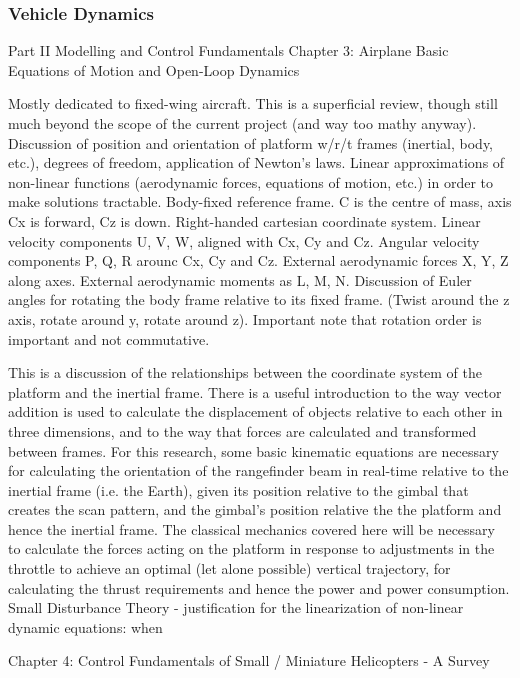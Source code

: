 \documentclass[10pt]{article}
\begin{document}
\subsubsection{Vehicle Dynamics}

\cite{Valavanis2007}

Part II Modelling and Control Fundamentals
Chapter 3: Airplane Basic Equations of Motion and Open-Loop Dynamics

Mostly dedicated to fixed-wing aircraft.
This is a superficial review, though still much beyond the scope of the current project (and way too mathy anyway).
Discussion of position and orientation of platform w/r/t frames (inertial, body, etc.), degrees of freedom, application of Newton’s laws.
Linear approximations of non-linear functions (aerodynamic forces, equations of motion, etc.) in order to make solutions tractable.
Body-fixed reference frame. C is the centre of mass, axis Cx is forward, Cz is down. Right-handed cartesian coordinate system.
Linear velocity components U, V, W, aligned with Cx, Cy and Cz.
Angular velocity components P, Q, R arounc Cx, Cy and Cz.
External aerodynamic forces X, Y, Z along axes. External aerodynamic moments as L, M, N.
Discussion of Euler angles for rotating the body frame relative to its fixed frame. (Twist around the z axis, rotate around y, rotate around z).
Important note that rotation order is important and not commutative.


This is a discussion of the relationships between the coordinate system of the platform and the inertial frame. There is a useful introduction to the way vector addition is used to calculate the displacement of objects relative to each other in three dimensions, and to the way that forces are calculated and transformed between frames. 
For this research, some basic kinematic equations are necessary for calculating the orientation of the rangefinder beam in real-time relative to the inertial frame (i.e. the Earth), given its position relative to the gimbal that creates the scan pattern, and the gimbal’s position relative the the platform and hence the inertial frame. 
The classical mechanics covered here will be necessary to calculate the forces acting on the platform in response to adjustments in the throttle to achieve an optimal (let alone possible) vertical trajectory, for calculating the thrust requirements and hence the power and power consumption.
Small Disturbance Theory - justification for the linearization of non-linear dynamic equations: when 

Chapter 4: Control Fundamentals of Small / Miniature Helicopters - A Survey
\end{document}

